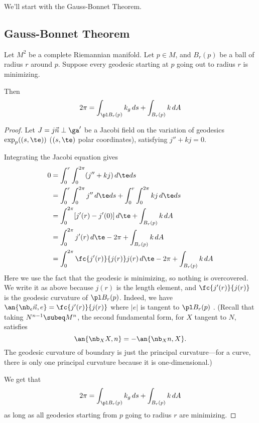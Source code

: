 
We'll start with the Gauss-Bonnet Theorem.

\subsection{Gauss-Bonnet Theorem}

\begin{thm}
Let $M^2$ be a complete Riemannian manifold. Let $p\in M$, and $B_r(p)$ be a ball of radius $r$ around $p$. Suppose every geodesic starting at $p$ going out to radius $r$ is minimizing. %

Then
\[
2\pi=\int_{\pl B_r(p)} k_g\,ds+\int_{B_r(p)} k\,dA
\]%
\end{thm}
\begin{proof}
Let $J=j\vec n\perp \ga'$ be a Jacobi field on the variation of geodesics $\exp_p((s,\te))$ ($(s,\te)$ polar coordinates), satisfying $j''+kj=0$. 

Integrating the Jacobi equation gives
\begin{align*}
0&=\int_0^r\int_0^{2\pi} (j''+kj) \, d\te ds \\
&=\int_0^r\int_0^{2\pi} j''\,d\te ds +\int_0^r\int_0^{2\pi} kj \, d\te ds\\
&=\int_0^{2\pi} [j'(r)-j'(0)]\,d\te +\int_{B_r(p)}k\,dA\\
&=\int_0^{2\pi}j'(r)\,d\te -2\pi +\int_{B_r(p)} k\,dA\\
&=\int_0^{2\pi} \fc{j'(r)}{j(r)} j(r)\,d\te-2\pi +\int_{B_r(p)} k\,dA
\end{align*}
Here we use the fact that the geodesic is minimizing, so nothing is overcovered.
We write it as above because $j(r)$ is the length element, and $\fc{j'(r)}{j(r)}$ is the geodesic curvature of $\pl B_r(p)$. Indeed, we have %
$\an{\nb_e\vec n,e}=\fc{j'(r)}{j(r)}$ where $|e|$ is tangent to $\pl B_r(p)$ . %
(Recall that taking $N^{n-1}\subeq M^n$, the second fundamental form, for $X$ tangent to $N$, satisfies
\[
\an{\nb_XX,n}=-\an{\nb_X n,X}.
\]
The geodesic curvature of boundary is just the principal curvature---for a curve, there is only one principal curvature because it is one-dimensional.)

We get that
\[
2\pi=\int_{\pl B_r(p)} k_g\,ds+\int_{B_r(p)} k\,dA
\]
as long as all geodesics starting from $p$ going to radius $r$ are minimizing. 
\end{proof}

